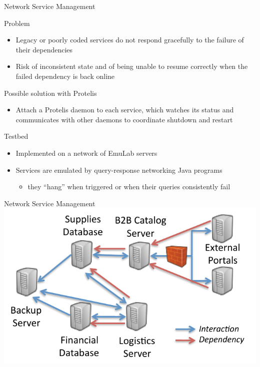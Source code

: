 \documentclass[presentation]{beamer} %
\begin{document}
\begin{frame}{Network Service Management}
  \begin{block} {Problem}
   \begin{itemize}
    \item Legacy or poorly coded services do not respond gracefully to the failure of their dependencies
    \item Risk of inconsistent state and of being unable to resume correctly when the failed dependency is back online
   \end{itemize}
  \end{block}
  \begin{block} {Possible solution with Protelis}
   \begin{itemize}
    \item Attach a Protelis daemon to each service, which watches its status and communicates with other daemons to coordinate shutdown and restart
   \end{itemize}
  \end{block}
  \begin{block} {Testbed}
   \begin{itemize}
    \item Implemented on a network of EmuLab servers
    \item Services are emulated by query-response networking Java programs
    \begin{itemize}
      \item they ``hang'' when triggered or when their queries consistently fail
    \end{itemize}
   \end{itemize}
  \end{block}
\end{frame}

\begin{frame}{Network Service Management}
  \centering
  \includegraphics[width=\textwidth{}]{imgs/managementScenario}
\end{frame}
\end{document}
